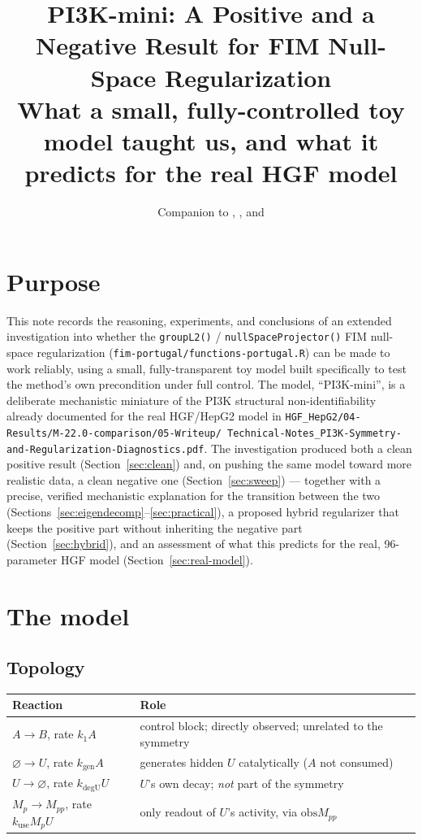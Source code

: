 \documentclass[11pt]{article}
\title{PI3K-mini: A Positive and a Negative Result for FIM Null-Space
Regularization\\[2pt]
\large What a small, fully-controlled toy model taught us, and what it
predicts for the real HGF model}
\author{}
\date{Companion to \file{scripts/example\_toy\_pi3kmini\_fim\_fit.R},
\file{scripts/example\_toy\_pi3kmini\_fim\_plots.R}, and
\file{scripts/example\_toy\_pi3kmini\_fim\_eigenvalue\_report.R}}
\newcommand{\code}[1]{\texttt{#1}}
\newcommand{\file}[1]{\textcolor{black!60}{\texttt{#1}}}
\begin{document}
\maketitle
\vspace{-1.5em}

\section{Purpose}

This note records the reasoning, experiments, and conclusions of an extended
investigation into whether the \code{groupL2()} / \code{nullSpaceProjector()}
FIM null-space regularization (\file{fim-portugal/functions-portugal.R}) can
be made to work reliably, using a small, fully-transparent toy model built
specifically to test the method's own precondition under full control. The
model, ``PI3K-mini'', is a deliberate mechanistic miniature of the PI3K
structural non-identifiability already documented for the real HGF/HepG2
model in \file{HGF\_HepG2/04-Results/M-22.0-comparison/05-Writeup/
Technical-Notes\_PI3K-Symmetry-and-Regularization-Diagnostics.pdf}. The
investigation produced both a clean positive result (Section~\ref{sec:clean})
and, on pushing the same model toward more realistic data, a clean negative
one (Section~\ref{sec:sweep}) --- together with a precise, verified
mechanistic explanation for the transition between the two
(Sections~\ref{sec:eigendecomp}--\ref{sec:practical}), a proposed hybrid
regularizer that keeps the positive part without inheriting the negative part
(Section~\ref{sec:hybrid}), and an assessment of what this predicts for the
real, 96-parameter HGF model (Section~\ref{sec:real-model}).

\section{The model}

\subsection{Topology}

\begin{center}
\begin{tabular}{ll}
\toprule
Reaction & Role \\
\midrule
$A \to B$, rate $k_1 A$ & control block; directly observed; unrelated to the symmetry \\
$\varnothing \to U$, rate $k_{\text{gen}} A$ & generates hidden $U$ catalytically ($A$ not consumed) \\
$U \to \varnothing$, rate $k_{\text{degU}} U$ & $U$'s own decay; \emph{not} part of the symmetry \\
$M_p \to M_{pp}$, rate $k_{\text{use}} M_p U$ & only readout of $U$'s activity, via $\mathrm{obs}M_{pp}$ \\
\bottomrule
\end{tabular}
\end{center}
\end{document}
